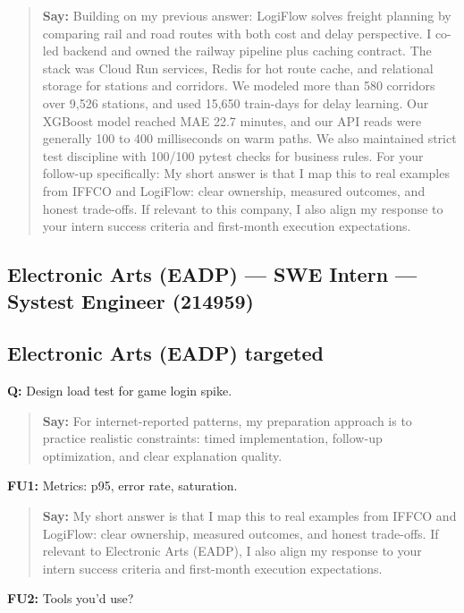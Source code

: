 \documentclass[9pt,a4paper]{article}
\begin{document}
\begin{quote}\small\textbf{Say:} Building on my previous answer: LogiFlow solves freight planning by comparing rail and road routes with both cost and delay perspective. I co-led backend and owned the railway pipeline plus caching contract. The stack was Cloud Run services, Redis for hot route cache, and relational storage for stations and corridors. We modeled more than 580 corridors over 9,526 stations, and used 15,650 train-days for delay learning. Our XGBoost model reached MAE 22.7 minutes, and our API reads were generally 100 to 400 milliseconds on warm paths. We also maintained strict test discipline with 100/100 pytest checks for business rules. For your follow-up specifically: My short answer is that I map this to real examples from IFFCO and LogiFlow: clear ownership, measured outcomes, and honest trade-offs. If relevant to this company, I also align my response to your intern success criteria and first-month execution expectations.\end{quote}
\vspace{2mm}
\newpage
\subsection{Electronic Arts (EADP) --- SWE Intern --- Systest Engineer (214959)}
\subsection{Electronic Arts (EADP) targeted}
\textbf{Q:} Design load test for game login spike.

\begin{quote}\small\textbf{Say:} For internet-reported patterns, my preparation approach is to practice realistic constraints: timed implementation, follow-up optimization, and clear explanation quality.\end{quote}
\vspace{2mm}
\textbf{FU1:} Metrics: p95, error rate, saturation.

\begin{quote}\small\textbf{Say:} My short answer is that I map this to real examples from IFFCO and LogiFlow: clear ownership, measured outcomes, and honest trade-offs. If relevant to Electronic Arts (EADP), I also align my response to your intern success criteria and first-month execution expectations.\end{quote}
\vspace{2mm}
\textbf{FU2:} Tools you'd use?
\end{document}
